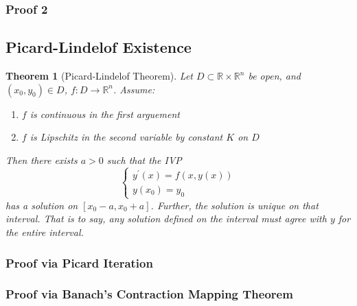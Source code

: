\documentclass[a4paper, 12pt]{book}
\newtheorem{theorem}{Theorem}[chapter]
\begin{document}
\subsubsection{Proof 2}
\subsection{Picard-Lindelof Existence}
\begin{theorem}
	[Picard-Lindelof Theorem]
	Let \( D \subset \mathbb{R}\times \mathbb{R}^n\) be open, and \( (x_0,y_0) \in D\), \( f:D \to \mathbb{R}^n \). Assume:
	\begin{enumerate}
		\item \( f \) is continuous in the first arguement
		\item \(f\) is Lipschitz in the second variable by constant \( K \) on \( D \)
	\end{enumerate}
	Then there exists \( a>0 \) such that the IVP \[
		\begin{cases}
			y^\prime(x)=f(x,y(x)) \\
			y(x_0)=y_0
		\end{cases}
	\]
	has a solution on \( [x_0-a, x_0+a] \). Further, the solution is unique on that interval. That is to say, any solution defined on the interval must agree with \( y \) for the entire interval.
\end{theorem}
\subsubsection{Proof via Picard Iteration}
\subsubsection{Proof via Banach's Contraction Mapping Theorem}
\end{document}
